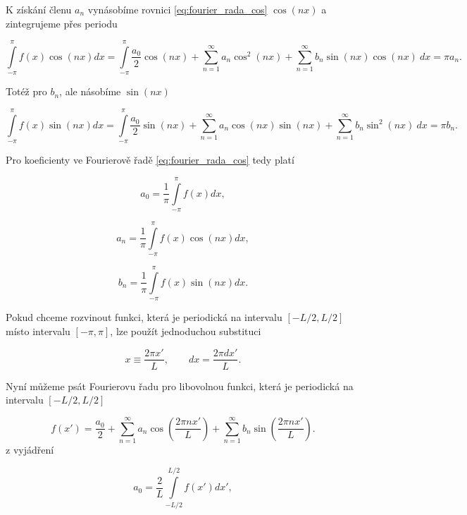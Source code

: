K získání členu $a_n$ vynásobíme rovnici \eqref{eq:fourier_rada_cos} $\cos(nx)$ a zintegrujeme přes periodu

\begin{equation}
\int\limits_{-\pi}^{\pi} f(x) \cos(nx) dx  = \int\limits_{-\pi}^{\pi} \frac{a_0}{2} \cos(nx) + \sum\limits_{n=1}^{\infty} a_n \cos^2(nx) + \sum\limits_{n=1}^{\infty} b_n \sin(nx)\cos(nx) ~ dx = \pi a_n.
\end{equation}

Totéž pro $b_n$, ale násobíme $\sin(nx)$

\begin{equation}
\int\limits_{-\pi}^{\pi} f(x) \sin(nx) dx  = \int\limits_{-\pi}^{\pi} \frac{a_0}{2} \sin(nx) + \sum\limits_{n=1}^{\infty} a_n \cos(nx) \sin(nx) + \sum\limits_{n=1}^{\infty} b_n \sin^2(nx) ~ dx = \pi b_n.
\end{equation}

Pro koeficienty ve Fourierově řadě \eqref{eq:fourier_rada_cos} tedy platí


\begin{equation}
a_0 = \frac{1}{\pi} \int\limits_{-\pi}^{\pi}f(x)dx,
\end{equation}

\begin{equation}
a_n = \frac{1}{\pi} \int\limits_{-\pi}^{\pi} f(x) \cos(nx) dx,
\end{equation}

\begin{equation}
b_n = \frac{1}{\pi} \int\limits_{-\pi}^{\pi} f(x) \sin(nx) dx.
\end{equation}


Pokud chceme rozvinout funkci, která je periodická na intervalu $[-L/2,L/2]$ místo intervalu $[-\pi,\pi]$, lze použít jednoduchou substituci

\begin{equation}
x \equiv \frac{2 \pi x'}{L}, \qquad dx=\frac{2 \pi dx'}{L}.
\end{equation}

Nyní můžeme psát Fourierovu řadu pro libovolnou funkci, která je periodická na intervalu $[-L/2,L/2]$

\begin{equation}
f(x') = \frac{a_0}{2} + \sum\limits_{n=1}^{\infty} a_n \cos \left( \frac{2 \pi n x'}{L} \right) + \sum\limits_{n=1}^{\infty} b_n \sin \left( \frac{2 \pi n x'}{L} \right).
\end{equation}z vyjádření

\begin{equation}
a_0 = \frac{2}{L} \int\limits_{-L/2}^{L/2} f(x') dx',
\end{equation}

